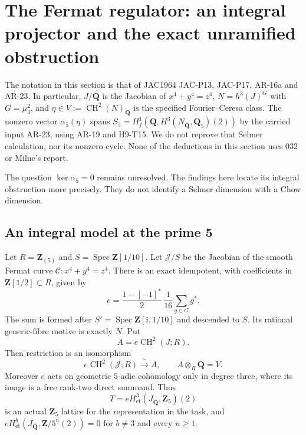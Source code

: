 
\section{The Fermat regulator: an integral projector and the exact
unramified obstruction}

The notation in this section is that of JAC1964 JAC-P13, JAC-P17,
AR-16a and AR-23.  In particular, $J/\mathbf Q$ is the Jacobian of
$x^4+y^4=z^4$, $N=h^3(J)^G$ with $G=\mu_4^2$, and
$\eta\in V:=\operatorname{CH}^2(N)_{\mathbf Q}$ is the specified
Fourier--Ceresa class.  The nonzero vector
$\alpha_5(\eta)$ spans
$S_5=H^1_f(\mathbf Q,H^3(N_{\overline{\mathbf Q}},\mathbf Q_5)(2))$
by the carried input AR-23, using AR-19 and H9-T15.  We do not reprove
that Selmer calculation, nor its nonzero cycle.  None of the deductions
in this section uses 032 or Milne's report.

The question $\ker\alpha_5=0$ remains unresolved.  The findings here
locate its integral obstruction more precisely.  They do not identify
a Selmer dimension with a Chow dimension.

\subsection{An integral model at the prime 5}

\begin{proposition}[C44-F01]\label{C44-F01}
Let $R=\mathbf Z_{(5)}$ and $S=\operatorname{Spec}\mathbf Z[1/10]$.
Let $\mathcal J/S$ be the Jacobian of the smooth Fermat curve
$\mathcal C:x^4+y^4=z^4$.  There is an exact idempotent, with
coefficients in $\mathbf Z[1/2]\subset R$, given by
\[
 e=\frac{1-[-1]^*}{2}\,\frac1{16}\sum_{g\in G}g^*.
 \tag{F01.1}
\]
The sum is formed after $S'=\operatorname{Spec}\mathbf Z[i,1/10]$
and descended to $S$.  Its rational generic-fibre motive is exactly
$N$.  Put
\[
 A=e\operatorname{CH}^2(J;R).
\]
Then restriction is an isomorphism
\[
 e\operatorname{CH}^2(\mathcal J;R)
       \xrightarrow{\ \sim\ } A,
 \qquad A\otimes_R\mathbf Q=V.                 \tag{F01.2}
\]
Moreover $e$ acts on geometric $5$-adic cohomology only in degree
three, where its image is a free rank-two direct summand.  Thus
\[
 T=eH^3_{\mathrm{et}}(J_{\overline{\mathbf Q}},\mathbf Z_5)(2)
 \tag{F01.3}
\]
is an actual $\mathbf Z_5$ lattice for the representation in the task,
and $eH^b_{\mathrm{et}}(J_{\overline{\mathbf Q}},\mathbf Z/5^n(2))=0$
for $b\ne3$ and every $n\ge1$.
\end{proposition}

